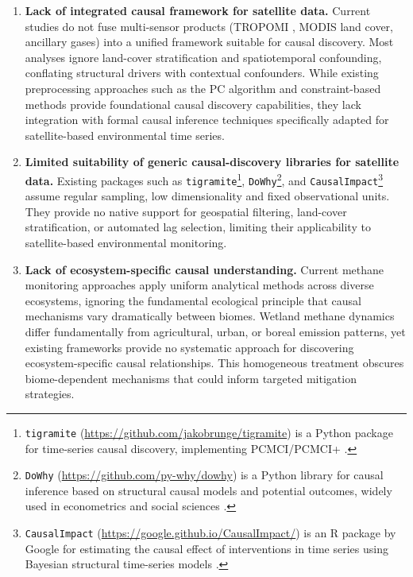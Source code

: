 \begin{enumerate}
	\item \textbf{Lack of integrated causal framework for satellite data.}
	      Current studies do not fuse multi-sensor products (TROPOMI , MODIS land cover, ancillary gases) into a unified framework suitable for causal discovery. Most analyses ignore land-cover stratification and spatiotemporal confounding, conflating structural drivers with contextual confounders. While existing preprocessing approaches such as the PC algorithm \cite{Spirtes2000} and constraint-based methods \cite{Peters2014} provide foundational causal discovery capabilities, they lack integration with formal causal inference techniques specifically adapted for satellite-based environmental time series.

	\item \textbf{Limited suitability of generic causal-discovery libraries for satellite data.}
	      Existing packages such as \texttt{tigramite}\footnote{\texttt{tigramite} (\url{https://github.com/jakobrunge/tigramite}) is a Python package for time-series causal discovery, implementing PCMCI/PCMCI+ \cite{Runge2019}.},
	      \texttt{DoWhy}\footnote{\texttt{DoWhy} (\url{https://github.com/py-why/dowhy}) is a Python library for causal inference based on structural causal models and potential outcomes, widely used in econometrics and social sciences \cite{angell_estimating_2021}.},
	      and \texttt{CausalImpact}\footnote{\texttt{CausalImpact} (\url{https://google.github.io/CausalImpact/}) is an R package by Google for estimating the causal effect of interventions in time series using Bayesian structural time-series models \cite{varian_big_2014}.}
	      assume regular sampling, low dimensionality and fixed observational units. They provide no native support for geospatial filtering, land-cover stratification, or automated lag selection, limiting their applicability to satellite-based environmental monitoring.

	\item \textbf{Lack of ecosystem-specific causal understanding.}
	      Current methane monitoring approaches apply uniform analytical methods across diverse ecosystems, ignoring the fundamental ecological principle that causal mechanisms vary dramatically between biomes. Wetland methane dynamics differ fundamentally from agricultural, urban, or boreal emission patterns, yet existing frameworks provide no systematic approach for discovering ecosystem-specific causal relationships. This homogeneous treatment obscures biome-dependent mechanisms that could inform targeted mitigation strategies.


\end{enumerate}

